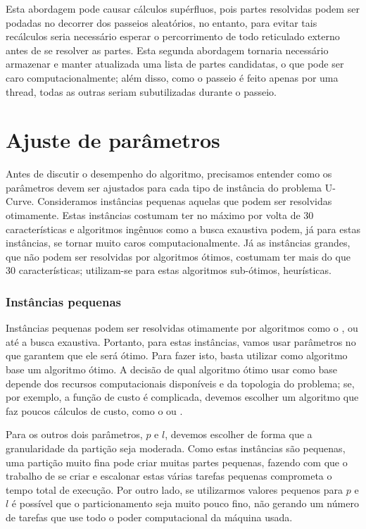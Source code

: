 Esta abordagem pode causar cálculos supérfluos, pois partes resolvidas
podem ser podadas no decorrer dos passeios aleatórios, no entanto, para 
evitar tais recálculos seria necessário esperar o percorrimento de todo
reticulado externo antes de se resolver as partes. Esta segunda 
abordagem tornaria necessário armazenar e manter atualizada uma lista de 
partes candidatas, o que pode ser caro computacionalmente; além disso, 
como o passeio é feito apenas por uma thread, todas as outras seriam
subutilizadas durante o passeio. 


\section{Ajuste de parâmetros}
\label{sec:pucs:parameters}
Antes de discutir o desempenho do algoritmo, precisamos entender como
os parâmetros devem ser ajustados para cada tipo de instância do 
problema U-Curve. Consideramos instâncias pequenas aquelas que podem ser
resolvidas otimamente. Estas instâncias costumam ter no máximo por volta
de 30 características e algoritmos ingênuos como a busca exaustiva 
podem, já para estas instâncias, se tornar muito caros 
computacionalmente. Já as instâncias grandes, que não podem ser 
resolvidas por algoritmos ótimos, costumam ter mais do que 30 
características; utilizam-se para estas algoritmos sub-ótimos, 
heurísticas.

\subsubsection{Instâncias pequenas}
Instâncias pequenas podem ser resolvidas otimamente por algoritmos
como o ,  ou até a busca exaustiva. Portanto, 
para estas instâncias, vamos usar parâmetros no  que 
garantem que ele será ótimo. Para fazer isto, basta utilizar como 
algoritmo base um algoritmo ótimo. A decisão de qual algoritmo ótimo
usar como base depende dos recursos computacionais disponíveis e da 
topologia do problema; se, por exemplo, a função de custo é complicada, 
devemos escolher um algoritmo que faz poucos cálculos de custo, como o 
 ou .

Para os outros dois parâmetros, $p$ e $l$, devemos escolher de forma
que a granularidade da partição seja moderada. Como estas instâncias 
são pequenas, uma partição muito fina pode criar muitas partes pequenas,
fazendo com que o trabalho de se criar e escalonar estas várias tarefas 
pequenas comprometa o tempo total de execução. Por outro lado, se 
utilizarmos valores pequenos para $p$ e $l$ é possível que o 
particionamento seja muito pouco fino, não gerando um número de tarefas
que use todo o poder computacional da máquina usada.

